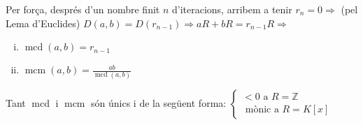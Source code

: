 Per força, després d'un nombre finit $n$ d'iteracions, arribem a tenir $r_{n}=0 \Rightarrow$ (pel Lema d'Euclides) $D (a,b) = D (r_{n-1}) \Rightarrow aR + bR = r_{n-1}R \Rightarrow$
\begin{enumerate}[i)]
    \item $\operatorname{mcd} (a,b) = r_{n-1} $
    \item $\operatorname{mcm} (a,b) = \frac{ab}{\operatorname{mcd} (a,b)}$
\end{enumerate}

Tant $\operatorname{mcd}$ i $\operatorname{mcm}$ són únics i de la següent forma: 
$\begin{cases} < 0 \text{ a } R = \mathbb{Z} \\ \text{ mònic a } R = K [x] \end{cases}$

